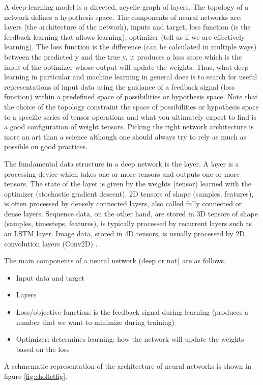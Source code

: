 \documentclass[11pt]{article}
\begin{document}
A deep-learning model is a directed, acyclic graph of layers. The topology of a network defines a hypothesis space.
The components of neural networks are: layers (the architecture of the network), inputs and target, loss function (is the feedback learning that allows learning), optimizer (tell us if we are effectively learning). The loss function is the difference (can be calculated in multiple ways) between the predicted y and the true y, it produces a loss score which is the input of the optimizer whose output will update the weights. 
Thus, what deep learning in particular and machine learning in general does is to search for useful representations of input data using the guidance of a feedback signal (loss function) within a predefined space of possibilities or hypothesis space. Note that the choice of the topology constraint the space of possibilities or hypothesis space to a specific series of tensor operations and what you ultimately expect to find is a good configuration of weight tensors. Picking the right network architecture is more an art than a science although one should always try to rely as much as possible on good practices.

The fundamental data structure in a deep network is the layer. A layer is a processing device which takes one or more tensors and outputs one or more tensors. The state of the layer is given by the weights (tensor) learned with the optimizer (stochastic gradient descent).
2D tensors of shape (samples, features), is often processed by densely connected layers, also called fully connected or dense layers. Sequence data, on the other hand, are stored in 3D tensors of shape (samples, timesteps, features), is typically processed by recurrent layers such as an LSTM layer. Image data, stored in 4D tensors, is usually processed by 2D convolution layers (Conv2D) \cite{chollet2017deep}.

The main components of a neural network (deep or not) are as follows.
\begin{itemize}
	\item Input data and target
	\item Layers
	\item Loss/objective function: is the feedback signal during learning (produces a number that we want to minimize during training) 
	\item Optimizer: determines learning: how the network will update the weights based on the loss

\end{itemize}
A schmematic representation of the architecture of neural networks is shown in figure \ref{fig:cholletfig}.
\end{document}
